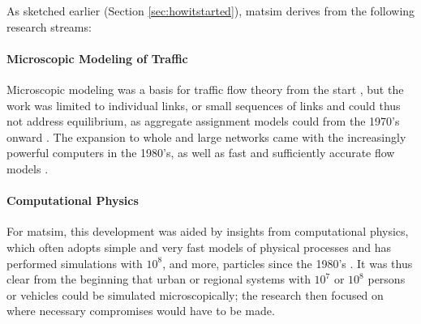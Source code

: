 As sketched earlier 
(Section \ref{sec:howitstarted}),
\gls{matsim} derives from the following research streams:

\paragraph{Microscopic Modeling of Traffic} 
Microscopic modeling was
a basis for traffic flow 
theory from the start 
\citep[e.g.,][]{theGang,Seddon_Simulation_1972,Wiedemann_PhDThesis_1974}, but the work was 
limited to individual links, or small sequences of links and could thus not address equilibrium, as aggregate assignment models could from the 1970’s onward \citep[see][]{Sheffi_1985,OrtuzarWillumsen_2011}. The expansion to whole and large networks came with the increasingly powerful computers in the 1980’s, as well as fast and sufficiently accurate flow models \citep[e.g.,][]{Schwerdtfeger_VolmulerHamerslag_1984, NagelSchreckenberg1992CA, Daganzo_TransResPartB_1994,Gawron_IJMPC_1998}.

\paragraph{Computational Physics} 
For \gls{matsim}, this development was aided by insights from computational physics, which often adopts simple and very fast models of physical processes and has performed simulations with $10^8$, and more, particles since the 1980's \citep[for a contemporary review see][]{BeazleyEtcMolec-dyn}.
It was thus clear from the beginning that urban or regional systems with $10^7$ or $10^8$ persons or vehicles could be simulated microscopically; the research then focused on where necessary compromises would have to be made.

